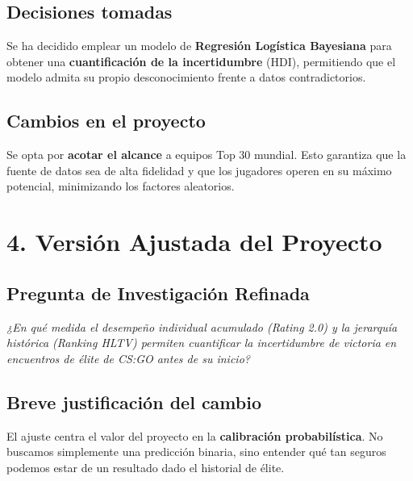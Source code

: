 \documentclass[12pt,a4paper]{article}
\begin{document}
\subsection{Decisiones tomadas}
Se ha decidido emplear un modelo de \textbf{Regresión Logística Bayesiana} para obtener una \textbf{cuantificación de la incertidumbre} (HDI), permitiendo que el modelo admita su propio desconocimiento frente a datos contradictorios.

\subsection{Cambios en el proyecto}
Se opta por \textbf{acotar el alcance} a equipos Top 30 mundial. Esto garantiza que la fuente de datos sea de alta fidelidad y que los jugadores operen en su máximo potencial, minimizando los factores aleatorios.

\section{4. Versión Ajustada del Proyecto}

\subsection{Pregunta de Investigación Refinada}
\textit{¿En qué medida el desempeño individual acumulado (Rating 2.0) y la jerarquía histórica (Ranking HLTV) permiten cuantificar la incertidumbre de victoria en encuentros de élite de CS:GO antes de su inicio?}

\subsection{Breve justificación del cambio}
El ajuste centra el valor del proyecto en la \textbf{calibración probabilística}. No buscamos simplemente una predicción binaria, sino entender qué tan seguros podemos estar de un resultado dado el historial de élite.
\end{document}
